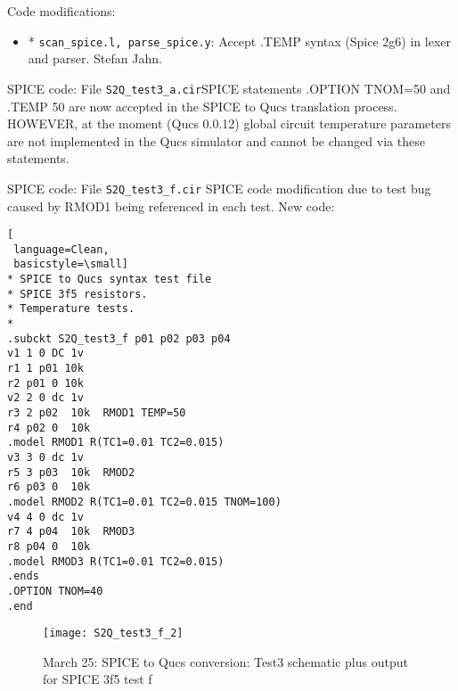 \begin{flushleft}
 Code modifications:

\begin{itemize}
 \item * \verb|scan_spice.l, parse_spice.y|: Accept .TEMP syntax (Spice 2g6)
        in lexer and parser. Stefan Jahn.
\end{itemize}

SPICE code: File \verb|S2Q_test3_a.cir|\linebreak SPICE statements .OPTION TNOM=50  and .TEMP 50 are now accepted in the SPICE to Qucs translation process. HOWEVER, at the moment (Qucs 0.0.12) global circuit temperature parameters are not implemented in the Qucs simulator and cannot be changed via these statements.

\end{flushleft}
\begin{flushleft}

SPICE code: File \verb|S2Q_test3_f.cir|\linebreak
SPICE code modification due to test bug caused by RMOD1 being referenced in each test.\linebreak
New code:
\begin{lstlisting}[
 language=Clean, 
 basicstyle=\small]
* SPICE to Qucs syntax test file 
* SPICE 3f5 resistors.
* Temperature tests.
*
.subckt S2Q_test3_f p01 p02 p03 p04 
v1 1 0 DC 1v
r1 1 p01 10k
r2 p01 0 10k
v2 2 0 dc 1v
r3 2 p02  10k  RMOD1 TEMP=50
r4 p02 0  10k
.model RMOD1 R(TC1=0.01 TC2=0.015)
v3 3 0 dc 1v
r5 3 p03  10k  RMOD2 
r6 p03 0  10k
.model RMOD2 R(TC1=0.01 TC2=0.015 TNOM=100)
v4 4 0 dc 1v
r7 4 p04  10k  RMOD3
r8 p04 0  10k
.model RMOD3 R(TC1=0.01 TC2=0.015)
.ends
.OPTION TNOM=40
.end
\end{lstlisting}

\end{flushleft}

\begin{figure}
  \centering
  \texttt{[image: S2Q\_test3\_f\_2]}
  \caption{March 25: SPICE to Qucs conversion: Test3 schematic plus output for SPICE 3f5 test f} 
  \label{fig:S2Qtest3_4}
\end{figure} 


